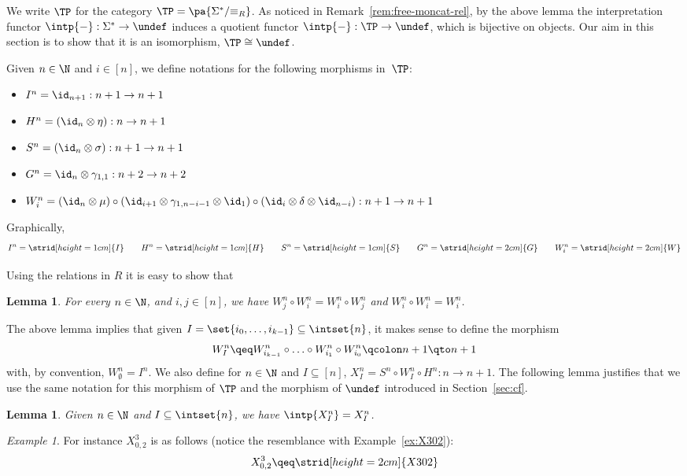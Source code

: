 \documentclass[submission,copyright,creativecommons]{eptcs}
\let\P\undef
\newtheorem{lemma}[theorem]{Lemma}
\theoremstyle{definition}
\theoremstyle{remark}
\newtheorem{example}[theorem]{Example}
\begin{document}
\noindent
We write $\TP$ for the category $\TP=\pa{\Sigma^*/{\equiv_R}}$. As noticed in
Remark~\ref{rem:free-moncat-rel}, by the above lemma the interpretation functor
$\intp{-}:\Sigma^*\to\P$ induces a quotient functor $\intp{-}:\TP\to\P$, which
is bijective on objects. Our aim in this section is to show that it is an
isomorphism, \ie $\TP\cong\P$.

Given $n\in\N$ and $i\in[n]$, we define notations for the following morphisms
in~$\TP$:
\begin{itemize}
\item $I^n=\id_{n+1}:n+1\to n+1$
\item $H^n=(\id_n\otimes\eta):n\to n+1$
\item $S^n=(\id_n\otimes\sigma):n+1\to n+1$
\item $G^n=\id_n\otimes\gamma_{1,1}:n+2\to n+2$
\item $W^n_i=(\id_n\otimes\mu)\circ(\id_{i+1}\otimes\gamma_{1,n-i-1}\otimes\id_1)\circ(\id_i\otimes\delta\otimes\id_{n-i}):n+1\to n+1$
\end{itemize}
Graphically,
\[
I^n=\strid[height=1cm]{I}
\qquad
H^n=\strid[height=1cm]{H}
\qquad
S^n=\strid[height=1cm]{S}
\qquad
G^n=\strid[height=2cm]{G}
\qquad
W^n_i=\strid[height=2cm]{W}
\]

Using the relations in $R$ it is easy to show that
\begin{lemma}
  For every $n\in\N$, and $i,j\in[n]$, we have $W^n_j\circ W^n_i=W^n_i\circ W^n_j$ and
  $W^n_i\circ W^n_i=W^n_i$.
\end{lemma}

\noindent
The above lemma implies that given $I=\set{i_0,\ldots,i_{k-1}}\subseteq\intset{n}$,
it makes sense to define the morphism
\[
W^n_I\qeq W^n_{i_{k-1}}\circ\ldots\circ W^n_{i_1}\circ W^n_{i_0}\qcolon n+1 \qto n+1
\]
with, by convention, $W^n_\emptyset=I^n$. We also define for $n\in\N$ and
$I\subseteq[n]$, $X^n_I=S^n\circ W^n_I\circ H^n:n\to n+1$. The following lemma
justifies that we use the same notation for this morphism of $\TP$ and the
morphism of $\P$ introduced in Section~\ref{sec:cf}.

\begin{lemma}
  Given $n\in\N$ and $I\subseteq\intset{n}$, we have $\intp{X^n_I}=X^n_I$.
\end{lemma}

\begin{example}
  For instance $X^3_{0,2}$ is as follows (notice the resemblance with
  Example~\ref{ex:X302}):
  \[
  X^3_{0,2}
  \qeq
  \strid[height=2cm]{X302}
  \]
\end{example}
\end{document}
